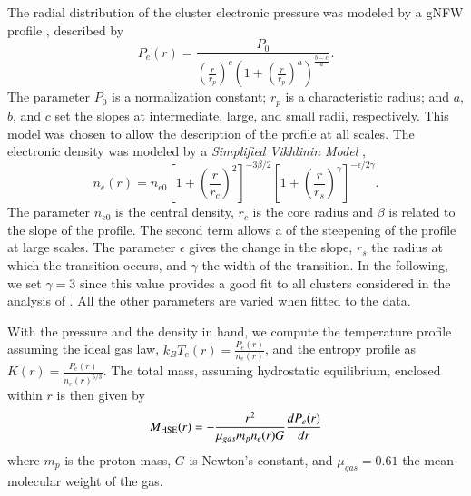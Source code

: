 \documentclass[twocolumn,traditabstract]{aa}
\begin{document}
The radial distribution of the cluster electronic pressure was modeled by a gNFW profile \citep{nagai2007}, described by
\begin{equation}
	P_e(r) = \frac{P_0}{\left(\frac{r}{r_p}\right)^c \left(1+\left(\frac{r}{r_p}\right)^a\right)^{\frac{b-c}{a}}}.
\label{eq:gNFW}
\end{equation}
The parameter $P_0$ is a normalization constant; $r_p$ is a characteristic radius; and $a$, $b$, and $c$ set the slopes at intermediate, large, and small radii, respectively. This model was chosen to allow the description of the profile at all scales. The electronic density was modeled by a \emph{Simplified Vikhlinin Model} \citep{vikhlinin2006},
\begin{equation}
	n_e(r) = n_{e0} \left[1+\left(\frac{r}{r_c}\right)^2 \right]^{-3 \beta /2} \left[ 1+\left(\frac{r}{r_s}\right)^{\gamma} \right]^{-\epsilon/2 \gamma}.
\label{eq:SVM}
\end{equation}
The parameter $n_{e0}$ is the central density, $r_c$ is the core radius and $\beta$ is related to the slope of the profile. The second term allows a of the steepening of the profile at large scales. The parameter $\epsilon$ gives the change in the slope, $r_s$ the radius at which the transition occurs, and $\gamma$ the width of the transition. In the following, we set $\gamma = 3$ since this value provides a good fit to all clusters considered in the analysis of \cite{vikhlinin2006}. All the other parameters are varied when fitted to the data.

With the pressure and the density in hand, we compute the temperature profile assuming the ideal gas law, $k_B T_e(r) = \frac{P_e(r)}{n_e(r)}$, and the entropy profile as $K(r) =  \frac{P_e(r)}{n_e(r)^{5/3}}$. The total mass, assuming hydrostatic equilibrium, enclosed within $r$ is then given by 
\begin{equation}
M_{\rm HSE}(r) = -\frac{r^2}{\mu_{gas} m_p n_e(r) G} \frac{dP_e(r)}{dr}
\end{equation}
where $m_p$ is the proton mass, $G$ is Newton’s constant, and $\mu_{gas} = 0.61$ the mean molecular weight of the gas.
\end{document}
